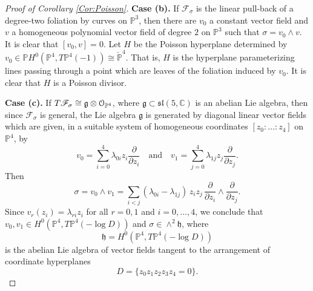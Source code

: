 \documentclass[twoside]{amsart}
\numberwithin{equation}{section}
\def\PP{{\mathbb{P}}}
\def\OO{\mathcal{O}}
\newcommand{\sF}{\mathscr{F}}
\newcommand{\tF}{{\rm T}\sF}
\theoremstyle{definition}
\begin{document}
\begin{proof}[Proof of Corollary \ref{Cor:Poisson}]
\medskip
\noindent\textbf{Case (b).}
If $\sF_\sigma$ is the linear pull-back of a degree-two foliation by curves on
$\PP^{3}$, then there are $v_0$ a constant vector field and $v$ a homogeneous
polynomial vector field of degree $2$ on $\PP^{3}$ such that $\sigma = v_0 \wedge v$.
It is clear that $[v_0,v]=0$. Let $H$ be the Poisson hyperplane determined by
$v_0\in \mathbb{P}H^0(\PP^{4}, T \PP^{4}(-1))\cong \check{\PP}^{4}$. That is, $H$ is
the hyperplane parameterizing lines passing through a point which are leaves of the
foliation induced by $v_0$. It is clear that $H$ is a Poisson divisor.

\medskip 
\noindent\textbf{Case (c).}
If $\tF_\sigma \cong \mathfrak{g}\otimes \OO_{\PP^{4}}$, where
$\mathfrak{g}\subset \mathfrak{sl}(5,\mathbb{C})$ is an abelian Lie algebra, then
since $\sF_\sigma$ is general, the Lie algebra $\mathfrak{g}$ is generated by diagonal
linear vector fields which are given, in a suitable system of homogeneous coordinates
$[z_0:\dots:z_4]$ on $\PP^{4}$, by
\[
v_0=\sum_{i=0}^{4} \lambda_{0i}z_{i}\dfrac{\partial}{\partial z_i}
\quad\text{and}\quad
v_1=\sum_{j=0}^{4} \lambda_{1j}z_{j}\dfrac{\partial}{\partial z_j}.
\]
Then
\[
\sigma=v_0\wedge v_1=\sum_{i<j}(\lambda_{0i}-\lambda_{1j})\,z_i z_j\,
\dfrac{\partial}{\partial z_i}\wedge \dfrac{\partial}{\partial z_j}.
\]
Since $v_r(z_i)= \lambda_{ri}z_{i}$ for all $r=0,1$ and $i=0,\dots,4$, we conclude that
$v_0,v_1\in H^0(\PP^{4}, T\PP^{4}(-\log D))$ and
$\sigma\in \wedge^2 \mathfrak{h}$, where
\[
\mathfrak{h}=H^0(\PP^{4}, T\PP^{4}(-\log D))
\]
is the abelian Lie algebra of vector fields tangent to the arrangement of coordinate
hyperplanes
\[
D=\{z_0 z_1 z_2 z_3 z_4=0\}.
\]


\end{proof}
\end{document}

